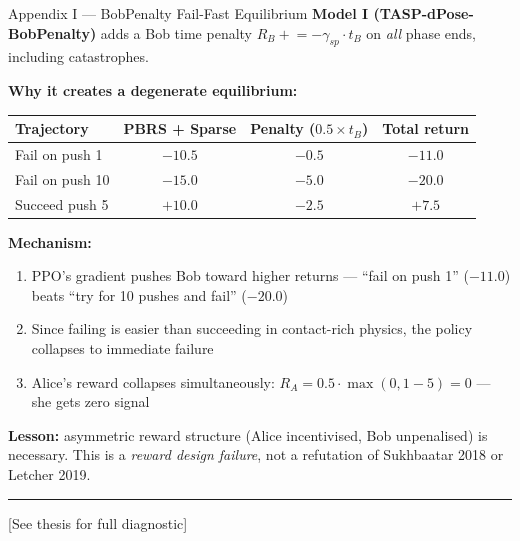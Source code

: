 \documentclass[aspectratio=169,xcolor=dvipsnames,t]{beamer}
\newcommand{\litfooter}[1]{%
  \vspace{2pt}%
  \hrule%
  \vspace{2pt}%
  {\tiny\color{LightDarkGrey} #1}%
}
\begin{document}
\begin{frame}[t]{Appendix I — BobPenalty Fail-Fast Equilibrium}
  \small
  \textbf{Model I (TASP-dPose-BobPenalty)} adds a Bob time penalty $R_B \mathrel{+}= -\gamma_{sp}\!\cdot\!t_B$ on \emph{all} phase ends, including catastrophes.

  \vspace{4pt}
  \textbf{Why it creates a degenerate equilibrium:}
  \begin{center}
  \begin{tabular}{lccc}
    \toprule
    \textbf{Trajectory} & \textbf{PBRS + Sparse} & \textbf{Penalty ($0.5\times t_B$)} & \textbf{Total return} \\
    \midrule
    Fail on push 1  & $-10.5$ & $-0.5$ & $\mathbf{-11.0}$ \\
    Fail on push 10 & $-15.0$ & $-5.0$ & $\mathbf{-20.0}$ \\
    Succeed push 5  & $+10.0$ & $-2.5$ & $\mathbf{+7.5}$ \\
    \bottomrule
  \end{tabular}
  \end{center}

  \textbf{Mechanism:}
  \begin{enumerate}
    \item PPO's gradient pushes Bob toward higher returns — ``fail on push 1'' ($-11.0$) beats ``try for 10 pushes and fail'' ($-20.0$)
    \item Since failing is easier than succeeding in contact-rich physics, the policy collapses to immediate failure
    \item Alice's reward collapses simultaneously: $R_A = 0.5\!\cdot\!\max(0, 1-5) = 0$ — she gets zero signal
  \end{enumerate}

  \textbf{Lesson:} asymmetric reward structure (Alice incentivised, Bob unpenalised) is necessary. This is a \emph{reward design failure}, not a refutation of Sukhbaatar 2018 or Letcher 2019.

  \vfill\litfooter{[See thesis  for full diagnostic]}
\end{frame}
\end{document}
